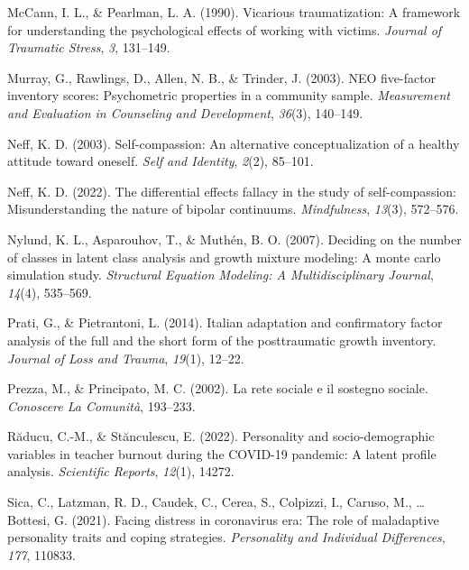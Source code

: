 \documentclass[
  man]{apa7}
\newlength{\cslhangindent}
\newlength{\cslentryspacingunit} %
\newenvironment{CSLReferences}[2] %
 {%
  \setlength{\parindent}{0pt}
  \ifodd #1
  \let\oldpar\par
  \def\par{\hangindent=\cslhangindent\oldpar}
  \fi
  \setlength{\parskip}{#2\cslentryspacingunit}
 }%
 {}
\begin{document}
\begin{CSLReferences}{1}{0}
\leavevmode{}%
McCann, I. L., \& Pearlman, L. A. (1990). Vicarious traumatization: A framework for understanding the psychological effects of working with victims. \emph{Journal of Traumatic Stress}, \emph{3}, 131--149.

\leavevmode{}%
Murray, G., Rawlings, D., Allen, N. B., \& Trinder, J. (2003). NEO five-factor inventory scores: Psychometric properties in a community sample. \emph{Measurement and Evaluation in Counseling and Development}, \emph{36}(3), 140--149.

\leavevmode{}%
Neff, K. D. (2003). Self-compassion: An alternative conceptualization of a healthy attitude toward oneself. \emph{Self and Identity}, \emph{2}(2), 85--101.

\leavevmode{}%
Neff, K. D. (2022). The differential effects fallacy in the study of self-compassion: Misunderstanding the nature of bipolar continuums. \emph{Mindfulness}, \emph{13}(3), 572--576.

\leavevmode{}%
Nylund, K. L., Asparouhov, T., \& Muthén, B. O. (2007). Deciding on the number of classes in latent class analysis and growth mixture modeling: A monte carlo simulation study. \emph{Structural Equation Modeling: A Multidisciplinary Journal}, \emph{14}(4), 535--569.

\leavevmode{}%
Prati, G., \& Pietrantoni, L. (2014). Italian adaptation and confirmatory factor analysis of the full and the short form of the posttraumatic growth inventory. \emph{Journal of Loss and Trauma}, \emph{19}(1), 12--22.

\leavevmode{}%
Prezza, M., \& Principato, M. C. (2002). La rete sociale e il sostegno sociale. \emph{Conoscere La Comunit{à}}, 193--233.

\leavevmode{}%
Răducu, C.-M., \& Stănculescu, E. (2022). Personality and socio-demographic variables in teacher burnout during the COVID-19 pandemic: A latent profile analysis. \emph{Scientific Reports}, \emph{12}(1), 14272.

\leavevmode{}%
Sica, C., Latzman, R. D., Caudek, C., Cerea, S., Colpizzi, I., Caruso, M., \ldots{} Bottesi, G. (2021). Facing distress in coronavirus era: The role of maladaptive personality traits and coping strategies. \emph{Personality and Individual Differences}, \emph{177}, 110833.


\end{CSLReferences}
\end{document}
